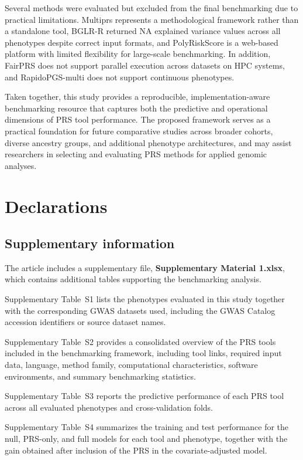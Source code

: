 \documentclass[pdflatex,sn-basic]{sn-jnl}
\begin{document}
Several methods were evaluated but excluded from the final benchmarking due to practical limitations. Multiprs represents a methodological framework rather than a standalone tool, BGLR-R returned NA explained variance values across all phenotypes despite correct input formats, and PolyRiskScore is a web-based platform with limited flexibility for large-scale benchmarking. In addition, FairPRS does not support parallel execution across datasets on HPC systems, and RapidoPGS-multi does not support continuous phenotypes.

Taken together, this study provides a reproducible, implementation-aware benchmarking resource that captures both the predictive and operational dimensions of PRS tool performance. The proposed framework serves as a practical foundation for future comparative studies across broader cohorts, diverse ancestry groups, and additional phenotype architectures, and may assist researchers in selecting and evaluating PRS methods for applied genomic analyses.




\section*{Declarations}
 \backmatter

\subsection*{Supplementary information}
The article includes a supplementary file, \textbf{Supplementary Material 1.xlsx}, which contains additional tables supporting the benchmarking analysis.

Supplementary Table~S1 lists the phenotypes evaluated in this study together with the corresponding GWAS datasets used, including the GWAS Catalog accession identifiers or source dataset names.

Supplementary Table~S2 provides a consolidated overview of the PRS tools included in the benchmarking framework, including tool links, required input data, language, method family, computational characteristics, software environments, and summary benchmarking statistics.

Supplementary Table~S3 reports the predictive performance of each PRS tool across all evaluated phenotypes and cross-validation folds.

Supplementary Table~S4 summarizes the training and test performance for the null, PRS-only, and full models for each tool and phenotype, together with the gain obtained after inclusion of the PRS in the covariate-adjusted model.
\end{document}
